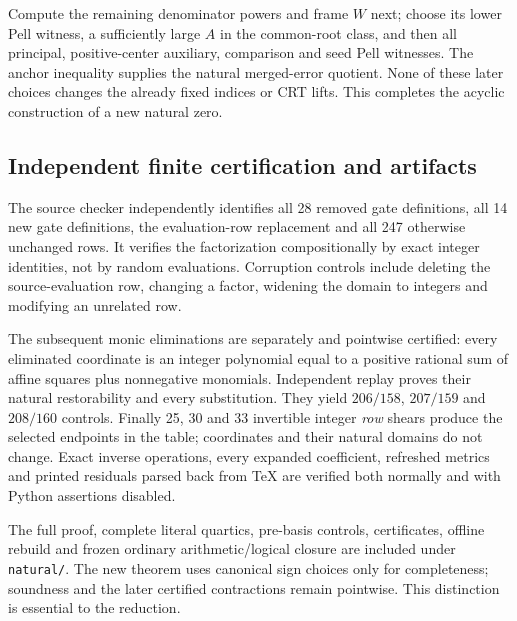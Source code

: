 Compute the remaining denominator powers and frame \(W\) next; choose its
lower Pell witness, a sufficiently large \(A\) in the common-root class,
and then all principal, positive-center auxiliary, comparison and seed Pell
witnesses. The anchor inequality supplies the natural merged-error quotient.
None of these later choices changes the already fixed indices or CRT lifts.
This completes the acyclic construction of a new natural zero.

\subsection{Independent finite certification and artifacts}

The source checker independently identifies all 28 removed gate definitions,
all 14 new gate definitions, the evaluation-row replacement and all 247
otherwise unchanged rows. It verifies the factorization compositionally by
exact integer identities, not by random evaluations. Corruption controls
include deleting the source-evaluation row, changing a factor, widening the
domain to integers and modifying an unrelated row.

The subsequent monic eliminations are separately and pointwise certified:
every eliminated coordinate is an integer polynomial equal to a positive
rational sum of affine squares plus nonnegative monomials. Independent
replay proves their natural restorability and every substitution. They yield
\(206/158\), \(207/159\) and \(208/160\) controls. Finally 25, 30 and 33 invertible integer
\emph{row} shears produce the selected endpoints in the table; coordinates
and their natural domains do not change. Exact inverse operations, every
expanded coefficient, refreshed metrics and printed residuals parsed back
from TeX are verified both normally and with Python assertions disabled.

The full proof, complete literal quartics, pre-basis controls, certificates,
offline rebuild and frozen ordinary arithmetic/logical closure are included
under \texttt{natural/}. The new theorem uses canonical sign choices only
for completeness; soundness and the later certified contractions remain
pointwise. This distinction is essential to the reduction.
